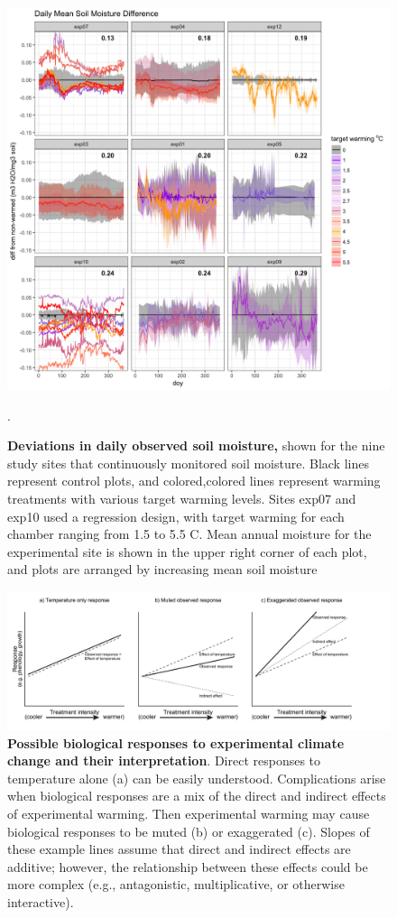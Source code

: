 \documentclass{article}
\begin{document}
 \begin{figure}[h]
    \centering
 \includegraphics{../Analyses/figures/Exploratory_TimeSeries_SoilMoist_Deviation.png}  
 \caption{\textbf{Deviations in daily observed soil moisture,} shown for the nine  study sites that continuously monitored soil moisture. Black lines represent control plots, and colored,colored lines represent warming treatments with various target warming levels. Sites exp07 and exp10 used a regression design, with target warming for each chamber ranging from 1.5 to 5.5 \degree C. Mean annual moisture for the experimental site is shown in the upper right corner of each plot, and plots are arranged by increasing mean soil moisture}. %
 \label{fig:mois}
 \end{figure}
 \begin{figure}[h]
 \includegraphics{../Analyses/figures/DirIndWarmingEffects.pdf} 
 \caption{\textbf{Possible biological responses to experimental climate change and their interpretation}. Direct responses to temperature alone (a) can be easily understood. Complications arise when biological responses are a mix of the direct and indirect effects of experimental warming. Then experimental warming may cause biological responses to be muted (b) or exaggerated (c). Slopes of these example lines assume that direct and indirect effects are additive; however, the relationship between these effects could be more complex (e.g., antagonistic, multiplicative, or otherwise interactive).} 
\label{fig:biolimp}
  \end{figure}
\end{document}
